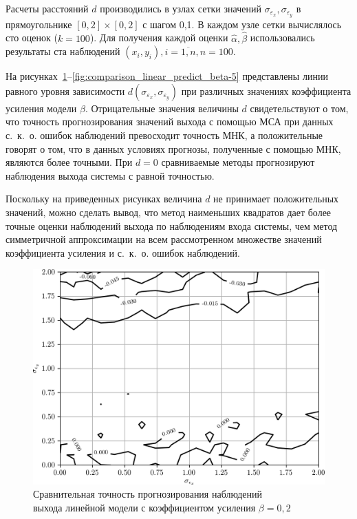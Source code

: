 Расчеты расстояний \( d \) производились в узлах сетки значений
\( \sigma_{\varepsilon_x}, \sigma_{\varepsilon_y} \) в прямоугольнике
\( [0, 2] \times [0, 2] \) с шагом 0{,}1.
В каждом узле сетки вычислялось сто оценок (\( k = 100 \)).
Для получения каждой оценки \( \hat{\alpha}, \hat{\beta} \) использовались результаты
ста наблюдений \( ( x_i, y_i ), i = \overline{1, n}, n = 100 \).

На рисунках~\ref{fig:comparison_linear_predict_beta-0,2}--\ref{fig:comparison_linear_predict_beta-5}
представлены линии равного уровня зависимости \( d(\sigma_{\varepsilon_x}, \sigma_{\varepsilon_y}) \)
при различных значениях коэффициента усиления модели \( \beta \).
Отрицательные значения величины \( d \) свидетельствуют о том,
что точность прогнозирования значений выхода с помощью МСА при данных с.~к.~о.
ошибок наблюдений превосходит точность МНК,
а положительные говорят о том, что в данных условиях прогнозы, полученные с помощью МНК,
являются более точными.
При \( d = 0 \) сравниваемые методы прогнозируют наблюдения выхода системы с
равной точностью.

Поскольку на приведенных рисунках величина \( d \) не принимает положительных значений,
можно сделать вывод, что метод наименьших квадратов дает более точные оценки
наблюдений выхода по наблюдениям входа системы, чем метод симметричной аппроксимации
на всем рассмотренном множестве значений коэффициента усиления и с.~к.~о. ошибок наблюдений.

\begin{figure}[h]
  \centering
  \includegraphics[width=135mm]{fig/linear/predict/beta-0,2_predict-measured.png}
  \caption{%
    Сравнительная точность прогнозирования наблюдений \\
    выхода линейной модели с коэффициентом усиления \( \beta = 0{,}2 \)
  }\label{fig:comparison_linear_predict_beta-0,2}
\end{figure}

